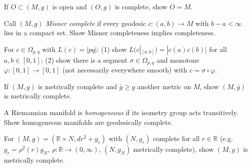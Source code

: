 \begin{remark}
  \label{rem:pet-ch5-ex-5}
  If $O\subset(M,g)$ is open and $(O,g)$ is complete, show $O=M$.
\end{remark}

\begin{remark}
  \label{rem:pet-ch5-ex-6}
  Call $(M,g)$ \emph{Misner complete} if every geodesic $c:(a,b)\to M$ with
  $b-a<\infty$ lies in a compact set. Show Misner completeness implies
  completeness.
\end{remark}

\begin{remark}
  \label{rem:pet-ch5-ex-7}
  For $c\in\Omega_{p,q}$ with $L(c)=|pq|$: (1) show $L(c|_{[a,b]})=|c(a)c(b)|$ for
  all $a,b\in[0,1]$; (2) show there is a segment $\sigma\in\Omega_{p,q}$ and
  monotone $\varphi:[0,1]\to[0,1]$ (not necessarily everywhere smooth) with
  $c=\sigma\circ\varphi$.
\end{remark}

\begin{remark}
  \label{rem:pet-ch5-ex-8}
  If $(M,g)$ is metrically complete and $\bar g\ge g$ another metric on $M$, show
  $(M,\bar g)$ is metrically complete.
\end{remark}

\begin{remark}
  \label{rem:pet-ch5-ex-9}
  A Riemannian manifold is \emph{homogeneous} if its isometry group acts
  transitively. Show homogeneous manifolds are geodesically complete.
\end{remark}

\begin{remark}
  \label{rem:pet-ch5-ex-10}
  For $(M,g)=(\mathbb R\times N,dr^2+g_r)$ with $(N,g_r)$ complete for all
  $r\in\mathbb R$ (e.g.\ $g_r=\rho^2(r)g_N$, $\rho:\mathbb R\to(0,\infty)$, $(N,g_N)$
  metrically complete), show $(M,g)$ is metrically complete.
\end{remark}

